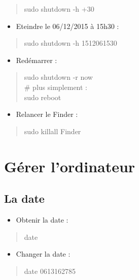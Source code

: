 \begin{quote}
sudo shutdown -h +30
\end{quote}

\begin{itemize}
\tightlist
\item
  Eteindre le 06/12/2015 à 15h30 :
\end{itemize}

\begin{quote}
sudo shutdown -h 1512061530
\end{quote}

\begin{itemize}
\tightlist
\item
  Redémarrer :
\end{itemize}

\begin{quote}
sudo shutdown -r now\\
\# plus simplement :\\
sudo reboot
\end{quote}

\begin{itemize}
\tightlist
\item
  Relancer le Finder :
\end{itemize}

\begin{quote}
sudo killall Finder
\end{quote}

\section{Gérer l'ordinateur}\label{guxe9rer-lordinateur}

\subsection{La date}\label{la-date}

\begin{itemize}
\tightlist
\item
  Obtenir la date :
\end{itemize}

\begin{quote}
date
\end{quote}

\begin{itemize}
\tightlist
\item
  Changer la date :
\end{itemize}

\begin{quote}
date 0613162785
\end{quote}

